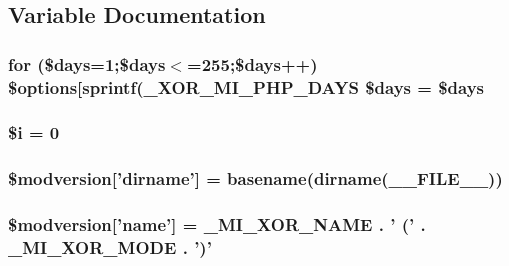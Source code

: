 \subsection{Variable Documentation}
\hypertarget{xoops__version_8php_a795feb91f53abe1674955a391b25baac}{
\subsubsection[{\$days}]{\setlength{\rightskip}{0pt plus 5cm}for (\$days=1;\$days$<$=255;\$days++) \$options\mbox{[}sprintf({\bf \-\_\-\-X\-O\-R\-\_\-\-M\-I\-\_\-\-P\-H\-P\-\_\-\-D\-A\-Y\-S} \$days = \$days}}\label{xoops__version_8php_a795feb91f53abe1674955a391b25baac}
\hypertarget{xoops__version_8php_a83018d9153d17d91fbcf3bc10158d34f}{
\subsubsection[{\$i}]{\setlength{\rightskip}{0pt plus 5cm}\$i = 0}}\label{xoops__version_8php_a83018d9153d17d91fbcf3bc10158d34f}
\hypertarget{xoops__version_8php_a39d2d4621e3065109051fa95e5ea69d9}{
\subsubsection[{\$modversion}]{\setlength{\rightskip}{0pt plus 5cm}\$modversion\mbox{[}'dirname'\mbox{]} = basename(dirname(\-\_\-\-\_\-\-F\-I\-L\-E\-\_\-\-\_\-))}}\label{xoops__version_8php_a39d2d4621e3065109051fa95e5ea69d9}
\hypertarget{xoops__version_8php_a5cdbd2ac9e212ff077aaa59101b3b867}{
\subsubsection[{\$modversion}]{\setlength{\rightskip}{0pt plus 5cm}\$modversion\mbox{[}'name'\mbox{]} = {\bf \-\_\-\-M\-I\-\_\-\-X\-O\-R\-\_\-\-N\-A\-M\-E} . ' (' . \-\_\-\-M\-I\-\_\-\-X\-O\-R\-\_\-\-M\-O\-D\-E . ')'}}\label{xoops__version_8php_a5cdbd2ac9e212ff077aaa59101b3b867}
